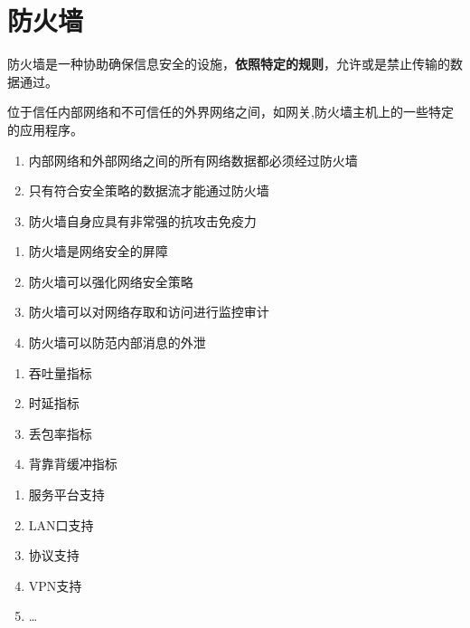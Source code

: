 \chapter{防火墙}
{}
防火墙是一种协助确保信息安全的设施，\textbf{依照特定的规则}，允许或是禁止传输的数据通过。

位于信任内部网络和不可信任的外界网络之间，如网关,防火墙主机上的一些特定的应用程序。

\begin{enumerate}
	\item 内部网络和外部网络之间的所有网络数据都必须经过防火墙
	\item 只有符合安全策略的数据流才能通过防火墙
	\item 防火墙自身应具有非常强的抗攻击免疫力
\end{enumerate}

\begin{enumerate}
	\item 防火墙是网络安全的屏障
	\item 防火墙可以强化网络安全策略
	\item 防火墙可以对网络存取和访问进行监控审计
	\item 防火墙可以防范内部消息的外泄
\end{enumerate}

\begin{enumerate}
	\item 吞吐量指标
	\item 时延指标
	\item 丢包率指标
	\item 背靠背缓冲指标
\end{enumerate}

\begin{enumerate}
	\item 服务平台支持
	\item LAN口支持
	\item 协议支持
	\item VPN支持
	\item \dots
\end{enumerate}

